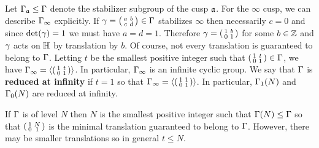     Let $\Gamma_{\mathfrak{a}} \le \Gamma$ denote the stabilizer subgroup of the cusp $\mathfrak{a}$. For the $\infty$ cusp, we can describe $\Gamma_{\infty}$ explicitly. If $\gamma = \begin{psmallmatrix} a & b \\ c & d \end{psmallmatrix} \in \Gamma$ stabilizes $\infty$ then necessarily $c = 0$ and since $\det(\gamma) = 1$ we must have $a = d = 1$. Therefore $\gamma = \begin{psmallmatrix} 1 & b \\ 0 & 1 \end{psmallmatrix}$ for some $b \in \mathbb{Z}$ and $\gamma$ acts on $\mathbb{H}$ by translation by $b$. Of course, not every translation is guaranteed to belong to $\Gamma$. Letting $t$ be the smallest positive integer such that $\begin{psmallmatrix} 1 & t \\ 0 & 1 \end{psmallmatrix} \in \Gamma$, we have $\Gamma_{\infty} = \left\langle\begin{psmallmatrix} 1 & t \\ 0 & 1 \end{psmallmatrix}\right\rangle$. In particular, $\Gamma_{\infty}$ is an infinite cyclic group. We say that $\Gamma$ is \textbf{reduced at infinity} if $t = 1$ so that $\Gamma_{\infty} = \left\langle\begin{psmallmatrix} 1 & 1 \\ 0 & 1 \end{psmallmatrix}\right\rangle$. In particular, $\Gamma_{1}(N)$ and $\Gamma_{0}(N)$ are reduced at infinity.
    
    \begin{remark}
      If $\Gamma$ is of level $N$ then $N$ is the smallest positive integer such that $\Gamma(N) \le \Gamma$ so that $\begin{psmallmatrix} 1 & N \\ 0 & 1 \end{psmallmatrix}$ is the minimal translation guaranteed to belong to $\Gamma$. However, there may be smaller translations so in general $t \le N$.
    \end{remark}
    
